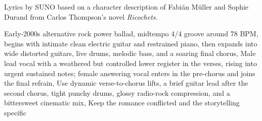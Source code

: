 
\begin{notes}
Lyrics by SUNO based on a character description of Fabián Müller and Sophie Durand %
from Carlos Thompson's novel \emph{Ricochets}.
\end{notes}
\begin{style}
Early-2000s alternative rock power ballad, midtempo 4/4 groove around 78 BPM, begins with intimate clean electric guitar and restrained piano, then expands into wide distorted guitars, live drums, melodic bass, and a soaring final chorus, Male lead vocal with a weathered but controlled lower register in the verses, rising into urgent sustained notes; female answering vocal enters in the pre-chorus and joins the final refrain, Use dynamic verse-to-chorus lifts, a brief guitar lead after the second chorus, tight punchy drums, glossy radio-rock compression, and a bittersweet cinematic mix, Keep the romance conflicted and the storytelling specific
\end{style}
